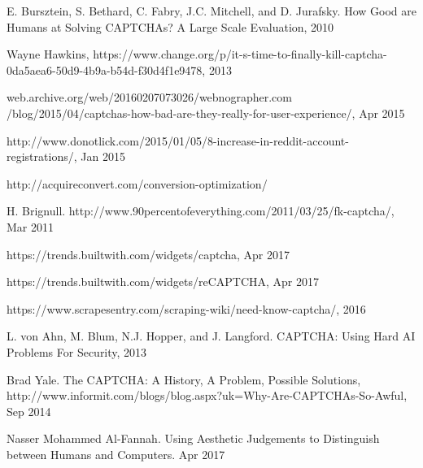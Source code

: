 \documentclass[a4paper]{IEEEtran}
\begin{document}
\begin{thebibliography}{30}
E. Bursztein, S. Bethard, C. Fabry, J.C. Mitchell, and D. Jurafsky. How Good are Humans at Solving CAPTCHAs? A Large Scale Evaluation, 2010

Wayne Hawkins, https://www.change.org/p/it-s-time-to-finally-kill-captcha-0da5aea6-50d9-4b9a-b54d-f30d4f1e9478, 2013 

web.archive.org/web/20160207073026/webnographer.com
/blog/2015/04/captchas-how-bad-are-they-really-for-user-experience/, Apr 2015

http://www.donotlick.com/2015/01/05/8-increase-in-reddit-account-registrations/, Jan 2015

http://acquireconvert.com/conversion-optimization/

H. Brignull. http://www.90percentofeverything.com/2011/03/25/fk-captcha/, Mar 2011

https://trends.builtwith.com/widgets/captcha, Apr 2017

https://trends.builtwith.com/widgets/reCAPTCHA, Apr 2017

https://www.scrapesentry.com/scraping-wiki/need-know-captcha/, 2016

L. von Ahn, M. Blum, N.J. Hopper, and J. Langford. CAPTCHA: Using Hard AI Problems For Security, 2013

Brad Yale. The CAPTCHA: A History, A Problem, Possible Solutions, http://www.informit.com/blogs/blog.aspx?uk=Why-Are-CAPTCHAs-So-Awful, Sep 2014

Nasser Mohammed Al-Fannah. Using Aesthetic Judgements to Distinguish between Humans and Computers. Apr 2017

\end{thebibliography}

\listoffigures
\end{document}
